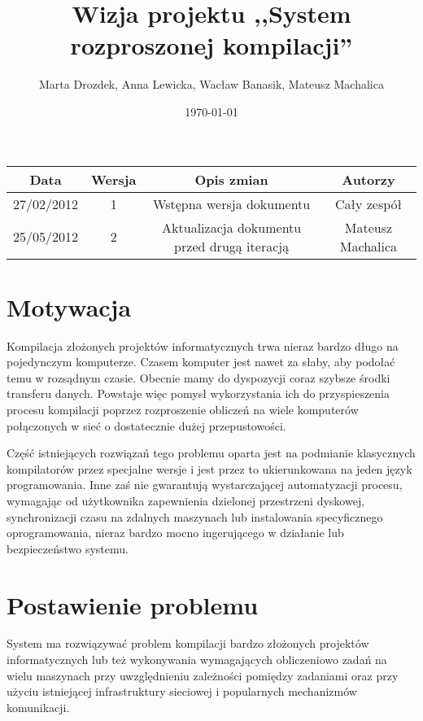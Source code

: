 \documentclass[a4paper]{article}
\title{Wizja projektu ,,System rozproszonej kompilacji''}
\author{Marta Drozdek, Anna Lewicka, Wacław Banasik, Mateusz Machalica}
\date{\today}
\begin{document}
\maketitle

\begin{table}[!h]
	\centering
	\begin{tabular}{|c|c|c|c|}
		\hline
		\textbf{Data} & \textbf{Wersja} & \textbf{Opis zmian} & \textbf{Autorzy} \\ \hline
		27/02/2012 & 1 & Wstępna wersja dokumentu & Cały zespół \\ \hline
		25/05/2012 & 2 & Aktualizacja dokumentu przed drugą iteracją & Mateusz Machalica \\ \hline
	\end{tabular}
\end{table}

\section{Motywacja}

Kompilacja złożonych projektów informatycznych trwa nieraz bardzo długo na pojedynczym komputerze. Czasem komputer jest nawet za słaby, aby podołać temu w rozsądnym czasie. Obecnie mamy do dyspozycji coraz szybsze środki transferu danych. Powstaje więc pomysł wykorzystania ich do przyspieszenia procesu kompilacji poprzez rozproszenie obliczeń na wiele komputerów połączonych w sieć o dostatecznie dużej przepustowości.

Część istniejących rozwiązań tego problemu oparta jest na podmianie klasycznych kompilatorów przez specjalne wersje i jest przez to ukierunkowana na jeden język programowania. Inne zaś nie gwarantują wystarczającej automatyzacji procesu, wymagając od użytkownika zapewnienia dzielonej przestrzeni dyskowej, synchronizacji czasu na zdalnych maszynach lub instalowania specyficznego oprogramowania, nieraz bardzo mocno ingerującego w działanie lub bezpieczeństwo systemu.

\section{Postawienie problemu}

System ma rozwiązywać problem kompilacji bardzo złożonych projektów informatycznych lub też wykonywania wymagających obliczeniowo zadań na wielu maszynach przy uwzględnieniu zależności pomiędzy zadaniami oraz przy użyciu istniejącej infrastruktury sieciowej i popularnych mechanizmów komunikacji.
\end{document}
